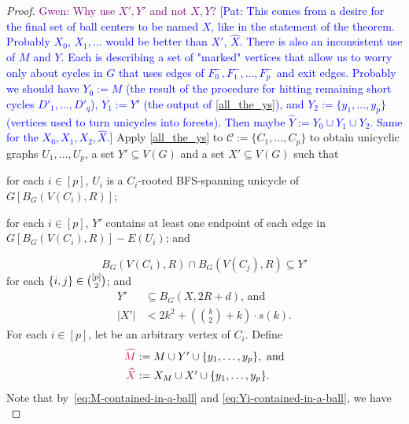 \documentclass{patmorin}
\newcommand{\pat}[1]{\textcolor{Blue}{[Pat: #1]}}
\newcommand{\gwen}[1]{\textcolor{Purple}{Gwen: #1}}
\DeclarePairedDelimiter\set{\{}{\}}
\begin{document}
\begin{proof}
\gwen{Why use $X', Y'$ and not $X, Y$?} \pat{This comes from a desire for the final set of ball centers to be named $X$, like in the statement of the theorem.  Probably $X_0$, $X_1, \ldots$ would be better than $X'$, $\widehat{X}$.  There is also an inconsistent use of $M$ and $Y$. Each is describing a set of "marked" vertices that allow us to worry only about cycles in $G$ that uses edges of $F_0^-,F_1^-,\ldots,F_p^-$ and exit edges. Probably we should have $Y_0:=M$ (the result of the procedure for hitting remaining short cycles $D'_1,\ldots,D'_q$), $Y_1:=Y'$ (the output of \cref{all_the_ys}), and $Y_2:=\{y_1,\ldots,y_p\}$ (vertices used to turn unicycles into forests).  Then maybe $\widehat{Y}:=Y_0\cup Y_1\cup Y_2$.  Same for the $X_0,X_1,X_2,\widehat{X}$.}
Apply \cref{all_the_ys} to $\mathcal{C}:=\{C_1,\ldots,C_p\}$ to obtain unicyclic graphs $U_1,\ldots,U_p$, a set
 $Y'\subseteq V(G)$ and a set $X'\subseteq V(G)$ such that 
    \begin{tightenum}%
      \item for each $i\in[p]$, $U_i$ is a  $C_i$-rooted BFS-spanning unicycle of $G[B_G(V(C_i),R)]$;
      \item for each $i\in[p]$, $Y'$
      contains at least one endpoint of each edge in $G[B_G(V(C_i),R)]- E(U_i)$; and
\end{tightenum}
\begin{equation}
B_{G}(V(C_i),R)\cap B_{G}(V(C_j),R)\subseteq Y'
\end{equation}
for each $\set{i,j}\in\binom{[p]}{2}$; and
\begin{align}
Y'&\subseteq B_G(X,2R+d)\text{, and} \label{eq:Yi-contained-in-a-ball}\\
|X'|&<\textstyle  2k^2+ (\binom{k}{2}+k)\cdot s(k). \label{eq:Xi-size}
\end{align}
For each $i\in[p]$, let  be an arbitrary vertex of $C_i$.
Define %
\begin{align*}
  \mathdefin{\widehat{M}}&:= \textstyle M \cup Y'\cup\{y_1,\ldots,y_p\},\ \textrm{and}\\
  \mathdefin{\widehat{X}}&:=\textstyle X_M\cup X'\cup\{y_1,\ldots,y_p\}.
\end{align*}
Note that by~\eqref{eq:M-contained-in-a-ball} and \eqref{eq:Yi-contained-in-a-ball}, we have
\begin{equation}\label{m_in_x_ball}

\end{equation}
\end{proof}
\end{document}
